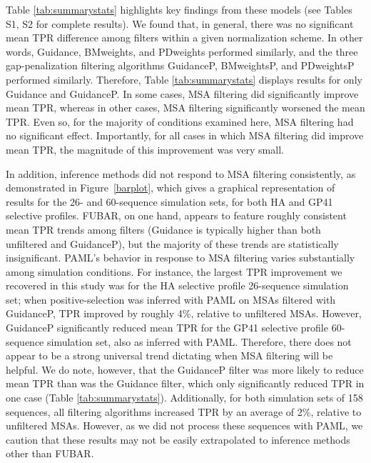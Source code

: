 \documentclass[11pt]{article}
\begin{document}
Table \ref{tab:summarystats} highlights key findings from these models (see Tables S1, S2 for complete results). We found that, in general, there was no significant mean TPR difference among filters within a given normalization scheme. In other words, Guidance, BMweights, and PDweights performed similarly, and the three gap-penalization filtering algorithms GuidanceP, BMweightsP, and PDweightsP performed similarly. Therefore, Table \ref{tab:summarystats} displays results for only Guidance and GuidanceP. In some cases, MSA filtering did significantly improve mean TPR, whereas in other cases, MSA filtering significantly worsened the mean TPR. Even so, for the majority of conditions examined here, MSA filtering had no significant effect. Importantly, for all cases in which MSA filtering did improve mean TPR, the magnitude of this improvement was very small. 

In addition, inference methods did not respond to MSA filtering consistently, as demonstrated in Figure~\ref{barplot}, which gives a graphical representation of results for the 26- and 60-sequence simulation sets, for both HA and GP41 selective profiles. FUBAR, on one hand, appears to feature roughly consistent mean TPR trends among filters (Guidance is typically higher than both unfiltered and GuidanceP), but the majority of these trends are statistically insignificant. PAML's behavior in response to MSA filtering varies substantially among simulation conditions. For instance, the largest TPR improvement we recovered in this study was for the HA selective profile 26-sequence simulation set; when positive-selection was inferred with PAML on MSAs filtered with GuidanceP, TPR improved by roughly 4\%, relative to unfiltered MSAs. However, GuidanceP significantly reduced mean TPR for the GP41 selective profile 60-sequence simulation set, also as inferred with PAML. Therefore, there does not appear to be a strong universal trend dictating when MSA filtering will be helpful. We do note, however, that the GuidanceP filter was more likely to reduce mean TPR than was the Guidance filter, which only significantly reduced TPR in one case (Table \ref{tab:summarystats}). Additionally, for both simulation sets of 158 sequences, all filtering algorithms increased TPR by an average of 2\%, relative to unfiltered MSAs. However, as we did not process these sequences with PAML, we caution that these results may not be easily extrapolated to inference methods other than FUBAR.
\end{document}
